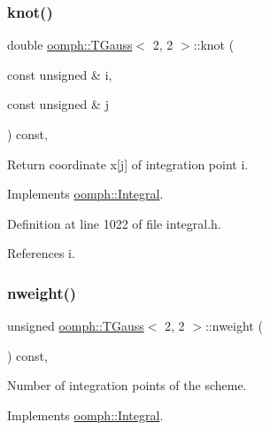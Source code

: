 \subsubsection{\texorpdfstring{knot()}{knot()}}
{\footnotesize\ttfamily double \hyperlink{classoomph_1_1TGauss}{oomph\+::\+T\+Gauss}$<$ 2, 2 $>$\+::knot (\begin{DoxyParamCaption}\item[{const unsigned \&}]{i,  }\item[{const unsigned \&}]{j }\end{DoxyParamCaption}) const\hspace{0.3cm}{\ttfamily [inline]}, {\ttfamily [virtual]}}



Return coordinate x\mbox{[}j\mbox{]} of integration point i. 



Implements \hyperlink{classoomph_1_1Integral_a1a2122f99a87c18649bafdd9ed739758}{oomph\+::\+Integral}.



Definition at line 1022 of file integral.\+h.



References i.

\mbox{\label{classoomph_1_1TGauss_3_012_00_012_01_4_a62216f1c81c087131e0fee31d23bd165}} 
\subsubsection{\texorpdfstring{nweight()}{nweight()}}
{\footnotesize\ttfamily unsigned \hyperlink{classoomph_1_1TGauss}{oomph\+::\+T\+Gauss}$<$ 2, 2 $>$\+::nweight (\begin{DoxyParamCaption}{ }\end{DoxyParamCaption}) const\hspace{0.3cm}{\ttfamily [inline]}, {\ttfamily [virtual]}}



Number of integration points of the scheme. 



Implements \hyperlink{classoomph_1_1Integral_a1a270de9d99a1fcf1d25a6c1017f65fa}{oomph\+::\+Integral}.



